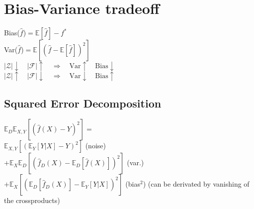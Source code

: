 \section*{Bias-Variance tradeoff}
Bias($\hat{f}$)$=\mathbb{E}[\hat{f}]-f^*$\\
Var($\hat{f}$)$=\mathbb{E}[(\hat{f}-\mathbb{E}[\hat{f}])^2]$\\
$|\mathcal{Z}|\downarrow \quad|\mathcal{F}|\uparrow\quad\Rightarrow\quad\mathrm{Var}\uparrow\quad\mathrm{Bias}\downarrow $\\
$|\mathcal{Z}|\uparrow \quad|\mathcal{F}|\downarrow\quad\Rightarrow\quad\mathrm{Var}\downarrow\quad\mathrm{Bias}\uparrow $

\subsection*{Squared Error Decomposition}
$\mathbb{E}_D\mathbb{E}_{X,Y}[(\hat{f}(X)-Y)^2]=$\\
$\mathbb{E}_{X,Y}[(\mathbb{E}_Y[Y|X]-Y)^2]$ (noise)\\
$+\mathbb{E}_X\mathbb{E}_D[(\hat{f}_D(X)-\mathbb{E}_D[\hat{f}(X)])^2]$ (var.)\\
$+\mathbb{E}_X[(\mathbb{E}_D[\hat{f}_D(X)]-\mathbb{E}_Y[Y|X])^2]$ (bias$^2$)
(can be derivated by vanishing of the crossproducts)